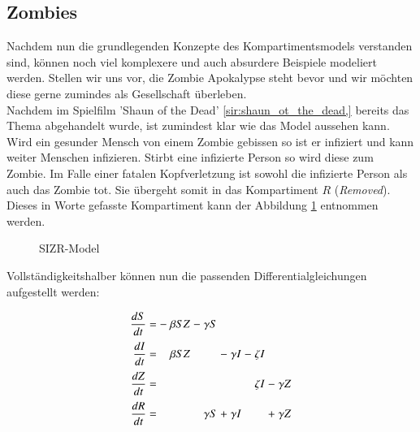 \begin{refsection}
\section{Zombies}
Nachdem nun die grundlegenden Konzepte des Kompartimentsmodels verstanden sind, können noch viel komplexere und auch absurdere Beispiele modeliert werden. Stellen wir uns vor, die Zombie Apokalypse steht bevor und wir möchten diese gerne zumindes als Gesellschaft überleben. 
\\
Nachdem im Spielfilm 'Shaun of the Dead' \ref{sir:shaun_ot_the_dead,} bereits das Thema abgehandelt wurde, ist zumindest klar wie das Model aussehen kann. Wird ein gesunder Mensch von einem Zombie gebissen so ist er infiziert und kann weiter Menschen infizieren. Stirbt eine infizierte Person so wird diese zum Zombie. Im Falle einer fatalen Kopfverletzung ist sowohl die infizierte Person als auch das Zombie tot. Sie übergeht somit in das Kompartiment $R$ (\emph{Removed}). Dieses in Worte gefasste Kompartiment kann der Abbildung \ref{fig:zombie_non_healing} entnommen werden.
\begin{figure}[ht]
  \centering
  
  \caption{SIZR-Model}
  \label{fig:zombie_non_healing}
\end{figure}
Vollständigkeitshalber können nun die passenden Differentialgleichungen aufgestellt werden:
\[
\arraycolsep=1.4pt\def\arraystretch{2.2}
  \begin{array}{rccrcrcrcrcr}
   \displaystyle\frac{dS}{dt} & = &-& \beta S Z  &-&  \gamma S & &         & & & & \\
   \displaystyle\frac{dI}{dt} & = & & \beta S Z  & &           &-&\gamma I &-& \zeta I  & & \\
   \displaystyle\frac{dZ}{dt} & = & &            & &           & &         & & \zeta I  &-& \gamma Z \\   
   \displaystyle\frac{dR}{dt} & = & &            & &  \gamma S &+&\gamma I & &          &+& \gamma Z \\


\end{array}\]
\end{refsection}
